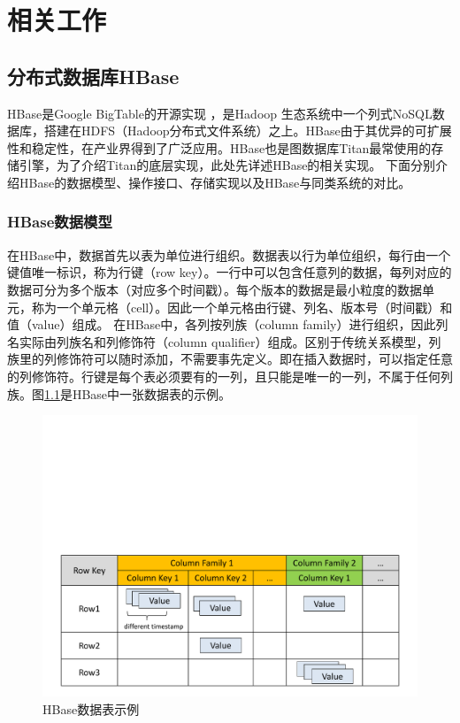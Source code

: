 
\chapter{相关工作}  \label{chap:related}
\section{分布式数据库HBase}
HBase是Google BigTable\supercite{bigtable}的开源实现 ，是Hadoop 生态系统中一个列式NoSQL数据库，搭建在HDFS（Hadoop分布式文件系统）之上。HBase由于其优异的可扩展性和稳定性，在产业界得到了广泛应用。HBase也是图数据库Titan最常使用的存储引擎，为了介绍Titan的底层实现，此处先详述HBase的相关实现。
下面分别介绍HBase的数据模型、操作接口、存储实现以及HBase与同类系统的对比。

\subsection{HBase数据模型}
在HBase中，数据首先以表为单位进行组织。数据表以行为单位组织，每行由一个键值唯一标识，称为行键（row key）。一行中可以包含任意列的数据，每列对应的数据可分为多个版本（对应多个时间戳）。每个版本的数据是最小粒度的数据单元，称为一个单元格（cell）。因此一个单元格由行键、列名、版本号（时间戳）和值（value）组成。
在HBase中，各列按列族（column family）进行组织，因此列名实际由列族名和列修饰符（column qualifier）组成。区别于传统关系模型，列族里的列修饰符可以随时添加，不需要事先定义。即在插入数据时，可以指定任意的列修饰符。行键是每个表必须要有的一列，且只能是唯一的一列，不属于任何列族。图\ref{fig:hbase_table}是HBase中一张数据表的示例。

\begin{figure}[htbp]
\centering
\includegraphics[width=120mm]{fig/HBase_table_example.pdf}
\caption{HBase数据表示例}
\label{fig:hbase_table}
\end{figure}

